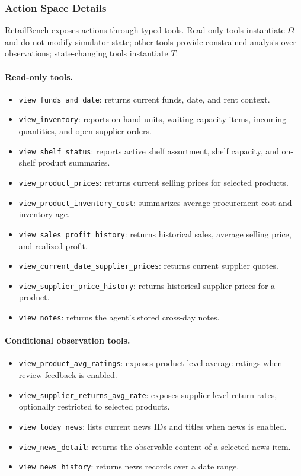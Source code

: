 \subsubsection{Action Space Details}
\label{app:action_space_details}

RetailBench exposes actions through typed tools. Read-only tools instantiate $\Omega$ and do not modify simulator state; other tools provide constrained analysis over observations; state-changing tools instantiate $T$.

\paragraph{Read-only tools.}
\begin{itemize}[leftmargin=*,nosep]
    \item \texttt{view\_funds\_and\_date}: returns current funds, date, and rent context.
    \item \texttt{view\_inventory}: reports on-hand units, waiting-capacity items, incoming quantities, and open supplier orders.
    \item \texttt{view\_shelf\_status}: reports active shelf assortment, shelf capacity, and on-shelf product summaries.
    \item \texttt{view\_product\_prices}: returns current selling prices for selected products.
    \item \texttt{view\_product\_inventory\_cost}: summarizes average procurement cost and inventory age.
    \item \texttt{view\_sales\_profit\_history}: returns historical sales, average selling price, and realized profit.
    \item \texttt{view\_current\_date\_supplier\_prices}: returns current supplier quotes.
    \item \texttt{view\_supplier\_price\_history}: returns historical supplier prices for a product.
    \item \texttt{view\_notes}: returns the agent's stored cross-day notes.
\end{itemize}

\paragraph{Conditional observation tools.}
\begin{itemize}[leftmargin=*,nosep]
    \item \texttt{view\_product\_avg\_ratings}: exposes product-level average ratings when review feedback is enabled.
    \item \texttt{view\_supplier\_returns\_avg\_rate}: exposes supplier-level return rates, optionally restricted to selected products.
    \item \texttt{view\_today\_news}: lists current news IDs and titles when news is enabled.
    \item \texttt{view\_news\_detail}: returns the observable content of a selected news item.
    \item \texttt{view\_news\_history}: returns news records over a date range.
\end{itemize}

